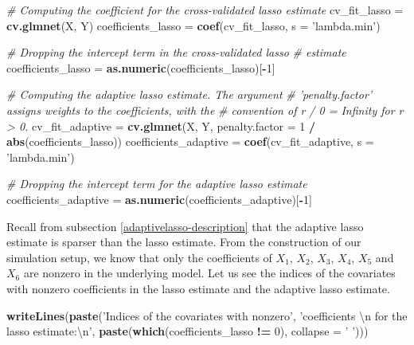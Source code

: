 \documentclass[
]{book}
\newenvironment{Shaded}{\begin{snugshade}}{\end{snugshade}}
\newcommand{\CharTok}[1]{\textcolor[rgb]{0.31,0.60,0.02}{#1}}
\newcommand{\CommentTok}[1]{\textcolor[rgb]{0.56,0.35,0.01}{\textit{#1}}}
\newcommand{\DataTypeTok}[1]{\textcolor[rgb]{0.13,0.29,0.53}{#1}}
\newcommand{\DecValTok}[1]{\textcolor[rgb]{0.00,0.00,0.81}{#1}}
\newcommand{\KeywordTok}[1]{\textcolor[rgb]{0.13,0.29,0.53}{\textbf{#1}}}
\newcommand{\NormalTok}[1]{#1}
\newcommand{\OperatorTok}[1]{\textcolor[rgb]{0.81,0.36,0.00}{\textbf{#1}}}
\newcommand{\StringTok}[1]{\textcolor[rgb]{0.31,0.60,0.02}{#1}}
\begin{document}
\begin{Shaded}
\begin{Highlighting}[]
\CommentTok{# Computing the coefficient for the cross-validated lasso estimate}
\NormalTok{cv_fit_lasso =}\StringTok{ }\KeywordTok{cv.glmnet}\NormalTok{(X, Y)}
\NormalTok{coefficients_lasso =}\StringTok{ }\KeywordTok{coef}\NormalTok{(cv_fit_lasso, }\DataTypeTok{s =} \StringTok{'lambda.min'}\NormalTok{)}

\CommentTok{# Dropping the intercept term in the cross-validated lasso}
\CommentTok{# estimate}
\NormalTok{coefficients_lasso =}\StringTok{ }\KeywordTok{as.numeric}\NormalTok{(coefficients_lasso)[}\OperatorTok{-}\DecValTok{1}\NormalTok{]}

\CommentTok{# Computing the adaptive lasso estimate. The argument}
\CommentTok{# 'penalty.factor' assigns weights to the coefficients, with the}
\CommentTok{# convention of r / 0 = Infinity for r > 0.}
\NormalTok{cv_fit_adaptive =}
\StringTok{  }\KeywordTok{cv.glmnet}\NormalTok{(X, Y, }\DataTypeTok{penalty.factor =} \DecValTok{1} \OperatorTok{/}\StringTok{ }\KeywordTok{abs}\NormalTok{(coefficients_lasso))}
\NormalTok{coefficients_adaptive =}\StringTok{ }\KeywordTok{coef}\NormalTok{(cv_fit_adaptive, }\DataTypeTok{s =} \StringTok{'lambda.min'}\NormalTok{)}

\CommentTok{# Dropping the intercept term for the adaptive lasso estimate}
\NormalTok{coefficients_adaptive =}\StringTok{ }\KeywordTok{as.numeric}\NormalTok{(coefficients_adaptive)[}\OperatorTok{-}\DecValTok{1}\NormalTok{]}
\end{Highlighting}
\end{Shaded}

Recall from subsection \ref{adaptivelasso-description} that the adaptive lasso estimate is sparser than the lasso estimate. From the construction of our simulation setup, we know that only the coefficients of \(X_1\), \(X_2\), \(X_3\), \(X_4\), \(X_5\) and \(X_6\) are nonzero in the underlying model. Let us see the indices of the covariates with nonzero coefficients in the lasso estimate and the adaptive lasso estimate.

\begin{Shaded}
\begin{Highlighting}[]
\KeywordTok{writeLines}\NormalTok{(}\KeywordTok{paste}\NormalTok{(}\StringTok{'Indices of the covariates with nonzero'}\NormalTok{,}
                 \StringTok{'coefficients }\CharTok{\textbackslash{}n}\StringTok{ for the lasso estimate:}\CharTok{\textbackslash{}n}\StringTok{'}\NormalTok{,}
                 \KeywordTok{paste}\NormalTok{(}\KeywordTok{which}\NormalTok{(coefficients_lasso }\OperatorTok{!=}\StringTok{ }\DecValTok{0}\NormalTok{),}
                       \DataTypeTok{collapse =} \StringTok{' '}\NormalTok{)))}
\end{Highlighting}
\end{Shaded}
\end{document}
